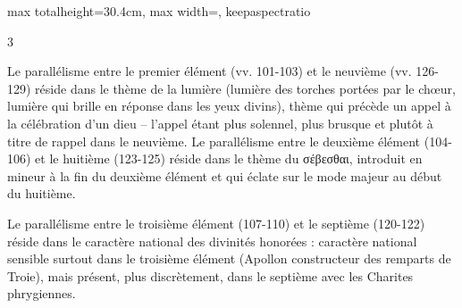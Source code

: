 \documentclass[11pt,twoside]{book}
\begin{document}
\begin{adjustbox}{max totalheight=30.4cm, max width=\textwidth, keepaspectratio}
\begin{minipage}{\textwidth}
{\begin{multicols}{3}
\par\vspace{1.5pt}
\noindent Le parallélisme entre le premier élément (vv. 101-103) et le neuvième (vv. 126-129) réside dans le thème de la lumière (lumière des torches portées par le chœur, lumière qui brille en réponse dans les yeux divins), thème qui précède un appel à la célébration d'un dieu – l'appel étant plus solennel, plus brusque et plutôt à titre de rappel dans le neuvième. Le parallélisme entre le deuxième élément (104-106) et le huitième (123-125) réside dans le thème du σέβεσθαι, introduit en mineur à la fin du deuxième élément et qui éclate sur le mode majeur au début du huitième.
\par\vspace{1.5pt}
\noindent Le parallélisme entre le troisième élément (107-110) et le septième (120-122) réside dans le caractère national des divinités honorées : caractère national sensible surtout dans le troisième élément (Apollon constructeur des remparts de Troie), mais présent, plus discrètement, dans le septième avec les Charites phrygiennes.
\par\vspace{1.5pt}

\end{multicols}}
\end{minipage}
\end{adjustbox}
\end{document}
